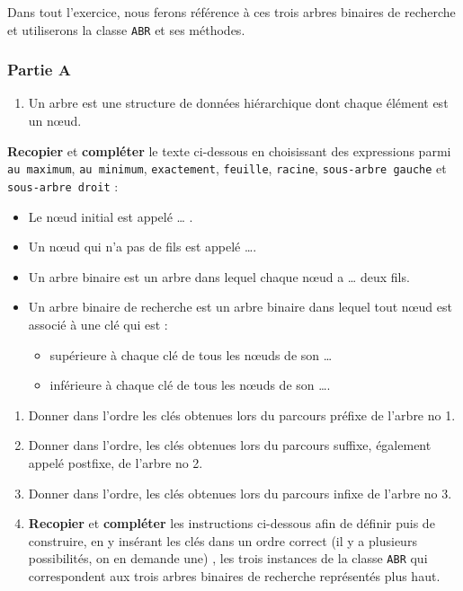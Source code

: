 Dans tout l'exercice, nous ferons référence à ces trois arbres binaires
de recherche et utiliserons la classe \texttt{ABR} et ses méthodes.

\subsubsection{Partie A}\label{partie-a}

\begin{enumerate}
\def\labelenumi{\arabic{enumi}.}
\tightlist
\item
  Un arbre est une structure de données hiérarchique dont chaque élément
  est un nœud.
\end{enumerate}

\textbf{Recopier} et \textbf{compléter} le texte ci-dessous en
choisissant des expressions parmi \texttt{au\ maximum},
\texttt{au\ minimum}, \texttt{exactement}, \texttt{feuille},
\texttt{racine}, \texttt{sous-arbre\ gauche} et
\texttt{sous-arbre\ droit} :

\begin{itemize}
\tightlist
\item
  Le nœud initial est appelé \ldots{} .
\item
  Un nœud qui n'a pas de fils est appelé \ldots.
\item
  Un arbre binaire est un arbre dans lequel chaque nœud a \ldots{} deux
  fils.
\item
  Un arbre binaire de recherche est un arbre binaire dans lequel tout
  nœud est associé à une clé qui est :

  \begin{itemize}
  \tightlist
  \item
    supérieure à chaque clé de tous les nœuds de son \ldots{}
  \item
    inférieure à chaque clé de tous les nœuds de son \ldots.
  \end{itemize}
\end{itemize}

\begin{enumerate}
\def\labelenumi{\arabic{enumi}.}
\setcounter{enumi}{1}
\item
  Donner dans l'ordre les clés obtenues lors du parcours préfixe de
  l'arbre no 1.
\item
  Donner dans l'ordre, les clés obtenues lors du parcours suffixe,
  également appelé postfixe, de l'arbre no 2.
\item
  Donner dans l'ordre, les clés obtenues lors du parcours infixe de
  l'arbre no 3.
\item
  \textbf{Recopier} et \textbf{compléter} les instructions ci-dessous
  afin de définir puis de construire, en y insérant les clés dans un
  ordre correct (il y a plusieurs possibilités, on en demande une) , les
  trois instances de la classe \texttt{ABR} qui correspondent aux trois
  arbres binaires de recherche représentés plus haut.
\end{enumerate}

